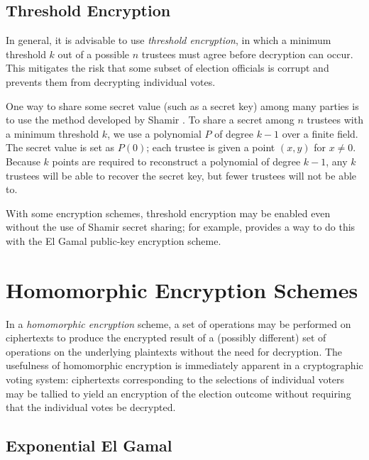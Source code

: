 \subsection{Threshold Encryption} \label{evote:design:threshold}
In general, it is advisable to use \emph{threshold encryption}, in which a minimum threshold $k$ out of a possible $n$ trustees must agree before decryption can occur. This mitigates the risk that some subset of election officials is corrupt and prevents them from decrypting individual votes.

One way to share some secret value (such as a secret key) among many parties is to use the method developed by Shamir \cite{shamir79}. To share a secret among $n$ trustees with a minimum threshold $k$, we use a polynomial $P$ of degree $k-1$ over a finite field. The secret value is set as $P(0)$; each trustee is given a point $(x, y)$ for $x \neq 0$. Because $k$ points are required to reconstruct a polynomial of degree $k-1$, any $k$ trustees will be able to recover the secret key, but fewer trustees will not be able to.

With some encryption schemes, threshold encryption may be enabled even without the use of Shamir secret sharing; for example, \cite{pedersen91, gennaro} provides a way to do this with the El Gamal public-key encryption scheme.

\section{Homomorphic Encryption Schemes} \label{evote:homomorphic}

In a \emph{homomorphic encryption} scheme, a set of operations may be performed on ciphertexts to produce the encrypted result of a (possibly different) set of operations on the underlying plaintexts without the need for decryption. The usefulness of homomorphic encryption is immediately apparent in a cryptographic voting system: ciphertexts corresponding to the selections of individual voters may be tallied to yield an encryption of the election outcome without requiring that the individual votes be decrypted.

\subsection{Exponential El Gamal} \label{evote:homomorphic:elgamal}

